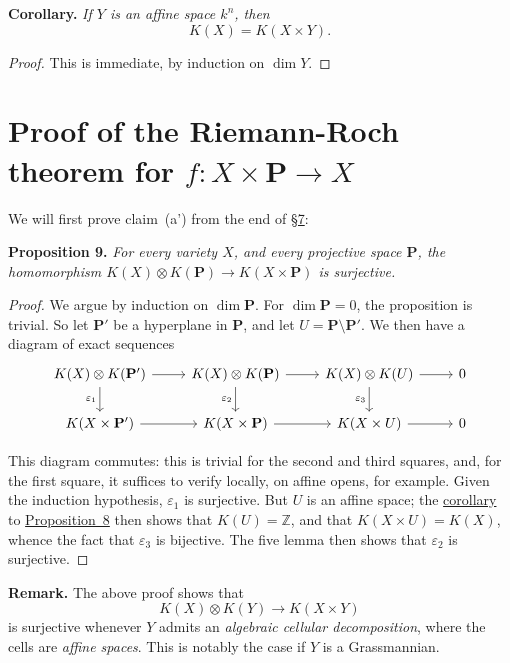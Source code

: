 \documentclass{article}
\newenvironment{itenv}[1]
  {\phantomsection\par\medskip\noindent\textbf{#1.}\itshape}
  {\medskip}
\newenvironment{rmenv}[1]
  {\phantomsection\par\medskip\noindent\textbf{#1.}\rmfamily}
  {\medskip}
\newcommand{\PP}{\mathbf{P}}
\begin{document}
\begin{itenv}{Corollary}
\label{corollary-8}
  If $Y$ is an affine space $k^n$, then
  \[
    K(X) = K(X\times Y).
  \]
\end{itenv}

\begin{proof}
  This is immediate, by induction on $\dim Y$.
\end{proof}


\section{Proof of the Riemann-Roch theorem for \texorpdfstring{$f\colon X\times\mathbf{P}\to X$}{f:XxP->X}}
\label{section9}

We will first prove claim~(a') from the end of \hyperref[section7]{\S7}:

\begin{itenv}{Proposition 9}
\label{proposition9}
  For every variety $X$, and every projective space $\PP$, the homomorphism $K(X)\otimes K(\PP)\to K(X\times \PP)$ is surjective.
\end{itenv}

\begin{proof}
  We argue by induction on $\dim\PP$.
  For $\dim\PP=0$, the proposition is trivial.
  So let $\PP'$ be a hyperplane in $\PP$, and let $U=\PP\setminus\PP'$.
  We then have a diagram of exact sequences
  \[
    \begin{tikzcd}
      K(X)\otimes K(\PP') \rar \dar[swap,"\varepsilon_1"]
      & K(X)\otimes K(\PP) \rar \dar[swap,"\varepsilon_2"]
      & K(X)\otimes K(U) \rar \dar[swap,"\varepsilon_3"]
      & 0
    \\K(X\times\PP') \rar
      & K(X\times\PP) \rar
      & K(X\times U) \rar
      & 0
    \end{tikzcd}
  \]

  This diagram commutes:
  this is trivial for the second and third squares, and, for the first square, it suffices to verify locally, on affine opens, for example.
  Given the induction hypothesis, $\varepsilon_1$ is surjective.
  But $U$ is an affine space;
  the \hyperref[corollary-8]{corollary} to \hyperref[proposition8]{Proposition~8} then shows that $K(U)=\mathbb{Z}$, and that $K(X\times U)=K(X)$, whence the fact that $\varepsilon_3$ is bijective.
  The five lemma then shows that $\varepsilon_2$ is surjective.
\end{proof}

\begin{rmenv}{Remark}
  The above proof shows that
  \[
    K(X)\otimes K(Y) \to K(X\times Y)
  \]
  is surjective whenever $Y$ admits an \emph{algebraic cellular decomposition}, where the cells are \emph{affine spaces}.
  This is notably the case if $Y$ is a Grassmannian.
\end{rmenv}
\end{document}
